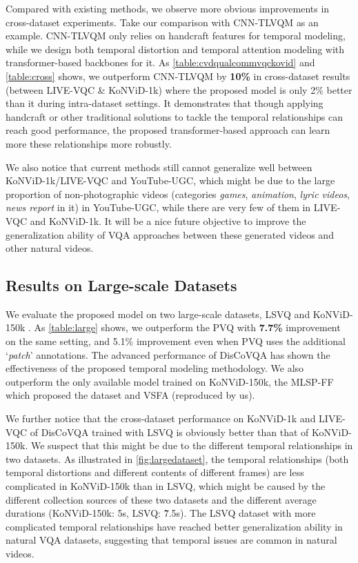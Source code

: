 \documentclass[journal]{IEEEtran}
\begin{document}
Compared with existing methods, we observe more obvious improvements in cross-dataset experiments. Take our comparison with CNN-TLVQM \cite{cnntlvqm} as an example. CNN-TLVQM only relies on handcraft features for temporal modeling, while we design both temporal distortion and temporal attention modeling with transformer-based backbones for it. As \cref{table:cvdqualcommvqckovid} and \cref{table:cross} shows, we outperform CNN-TLVQM by \textbf{10\%} in cross-dataset results (between LIVE-VQC \& KoNViD-1k) where the proposed model is only 2\% better than it during intra-dataset settings. It demonstrates that though applying handcraft or other traditional solutions to tackle the temporal relationships can reach good performance, the proposed transformer-based approach can learn more these relationships more robustly.

We also notice that current methods still cannot generalize well between KoNViD-1k/LIVE-VQC and YouTube-UGC, which might be due to the large proportion of non-photographic videos (categories \textit{games}, \textit{animation}, \textit{lyric videos}, \textit{news report} in it) in YouTube-UGC, while there are very few of them in LIVE-VQC and KoNViD-1k. It will be a nice future objective to improve the generalization ability of VQA approaches between these generated videos and other natural videos.


\subsection{Results on Large-scale Datasets} \label{sec:large}


We evaluate the proposed model on two large-scale datasets, LSVQ \cite{pvq} and KoNViD-150k \cite{mlsp}. As \cref{table:large} shows, we outperform the PVQ \cite{pvq} with \textbf{7.7\%} improvement on the same setting, and 5.1\% improvement even when PVQ uses the additional `\textit{patch}' annotations. The advanced performance of DisCoVQA has shown the effectiveness of the proposed temporal modeling methodology. We also outperform the only available model trained on KoNViD-150k, the MLSP-FF \cite{mlsp} which proposed the dataset and VSFA (reproduced by us).

We further notice that the cross-dataset performance on KoNViD-1k \cite{kv1k} and LIVE-VQC \cite{vqc} of DisCoVQA trained with LSVQ is obviously better than that of KoNViD-150k. We suspect that this might be due to the different temporal relationships in two datasets. As illustrated in \cref{fig:largedataset}, the temporal relationships (both temporal distortions and different contents of different frames) are less complicated in KoNViD-150k than in LSVQ, which might be caused by the different collection sources of these two datasets and the different average durations (KoNViD-150k: 5s, LSVQ: \~ 7.5s). The LSVQ dataset with more complicated temporal relationships have reached better generalization ability in natural VQA datasets, suggesting that temporal issues are common in natural videos. 
\end{document}
